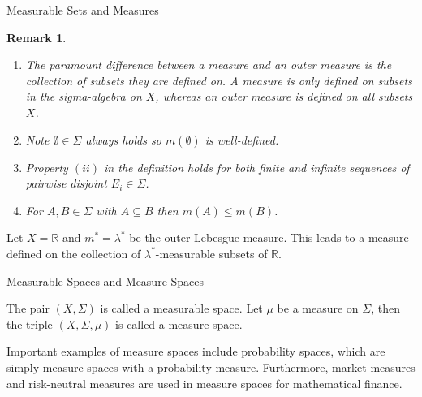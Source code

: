 \documentclass{beamer}
\newtheorem*{remark}{Remark}
\begin{document}
\begin{frame}{Measurable Sets and Measures}
\begin{remark}
\begin{enumerate}
    \item The paramount difference between a measure and an outer measure is the collection of subsets they are defined on. A measure is only defined on subsets in the sigma-algebra on $X$, whereas an outer measure is defined on all subsets $X$.
    \item Note $\emptyset\in\Sigma$ always holds so $m(\emptyset)$ is well-defined.
    \item Property $(ii)$ in the definition holds for both finite and infinite sequences of pairwise disjoint $E_{i}\in\Sigma$.
    \item For $A,B\in\Sigma$ with $A\subseteq B$ then $m(A)\leq m(B)$.
\end{enumerate}
\end{remark}

\begin{example}
Let $X=\mathbb{R}$ and $m^{*}=\lambda^{*}$ be the outer Lebesgue measure. This leads to a measure defined on the collection of $\lambda^{*}$-measurable subsets of $\mathbb{R}$.
\end{example}

\end{frame}

\begin{frame}{Measurable Spaces and Measure Spaces}

\begin{definition}
The pair $(X,\Sigma)$ is called a measurable space.\newline
Let $\mu$ be a measure on $\Sigma$, then the triple $(X,\Sigma,\mu)$ is called a measure space.
\end{definition}
Important examples of measure spaces include probability spaces, which are simply measure spaces with a probability measure. Furthermore, market measures and risk-neutral measures are used in measure spaces for mathematical finance.

\end{frame}
\end{document}
